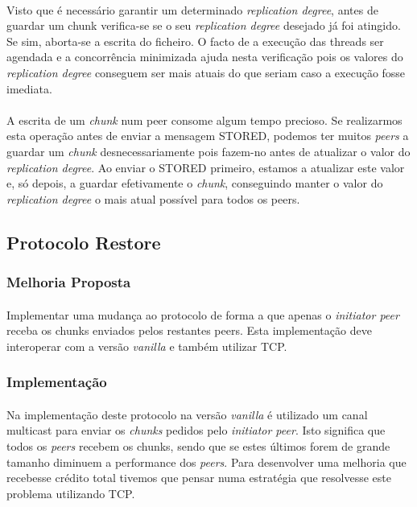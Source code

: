 \documentclass[11pt,oneside]{book}
\begin{document}
\paragraph{}
    Visto que é necessário garantir um determinado \textit{replication degree},
    antes de guardar um chunk verifica-se se o seu \textit{replication degree}
    desejado já foi atingido. Se sim, aborta-se a escrita do ficheiro. O facto de
    a execução das threads ser agendada e a concorrência minimizada ajuda nesta 
    verificação pois os valores do \textit{replication degree} conseguem ser mais
    atuais do que seriam caso a execução fosse imediata.
\paragraph{}
    A escrita de um \textit{chunk} num peer consome algum tempo precioso. Se
    realizarmos esta operação antes de enviar a mensagem STORED, podemos ter muitos
    \textit{peers} a guardar um \textit{chunk} desnecessariamente pois fazem-no
    antes de atualizar o valor do \textit{replication degree}. Ao enviar o STORED
    primeiro, estamos a atualizar este valor e, só depois, a guardar efetivamente o
    \textit{chunk}, conseguindo manter o valor do \textit{replication degree} o
    mais atual possível para todos os peers. 
 
\pagebreak

\subsection{Protocolo Restore}

\subsubsection{Melhoria Proposta}
\paragraph{}
Implementar uma mudança ao protocolo de forma a que apenas o 
\textit{initiator peer} receba os chunks enviados pelos restantes peers. 
Esta implementação deve interoperar com a versão \textit{vanilla} e também
utilizar TCP.

\subsubsection{Implementação}
\paragraph{}
    Na implementação deste protocolo na versão \textit{vanilla} é utilizado um
    canal multicast para enviar os \textit{chunks} pedidos pelo
    \textit{initiator peer}. Isto significa que todos os \textit{peers} recebem
    os chunks, sendo que se estes últimos forem de grande tamanho diminuem a 
    performance dos \textit{peers}. Para desenvolver uma melhoria que recebesse 
    crédito total tivemos que pensar numa estratégia que resolvesse este 
    problema utilizando TCP. 
\end{document}
